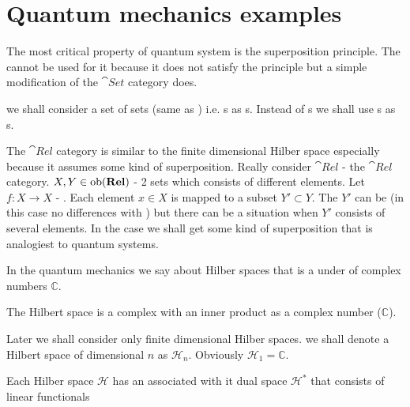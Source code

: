 \section{Quantum mechanics examples}
\label{sec:qmcategory_example}
The most critical property of quantum system is the superposition
principle. The  cannot be used for it
because it does not satisfy the principle but a simple modification
of the $\cat{Set}$ category does. 
\begin{definition}
  \label{def:relcategory}
  we shall consider a set of sets (same as )
  i.e. s as s. Instead of
  s we shall use s as
  s. 

  The $\cat{Rel}$ category is similar to the finite dimensional
  Hilber space especially because it assumes some kind of superposition.
  Really consider $\cat{Rel}$ - the $\cat{Rel}$ category. $X, Y \in
  \mathrm{ob}(\mathbf{Rel})$ - 2 sets which consists of different elements. Let $f: X
  \to X$ - . Each element $x \in X$ is
  mapped to a subset $Y' \subset Y$. The $Y'$ can be
    (in this case no differences with
  ) but there can be a situation when $Y'$
  consists of several elements. In the case we shall get some kind of
  superposition that is analogiest to quantum systems.
\end{definition}

In the quantum mechanics we say about Hilber spaces that is 
a  under  of complex
numbers $\mathbb{C}$. 



\begin{definition}
  \label{def:hilbert_space} The Hilbert space is a complex
   with an inner product as a complex
  number ($\mathbb{C}$). 

  Later we shall consider only finite dimensional Hilber spaces.
  we shall denote a Hilbert space of dimensional $n$ as
  $\mathcal{H}_n$. Obviously $\mathcal{H}_1 = \mathbb{C}$.
\end{definition}

\begin{definition}
\label{def:dual_space}
Each Hilber space $\mathcal{H}$ has an associated with it dual space
$\mathcal{H}^\ast$ that consists of linear functionals  
\end{definition}

